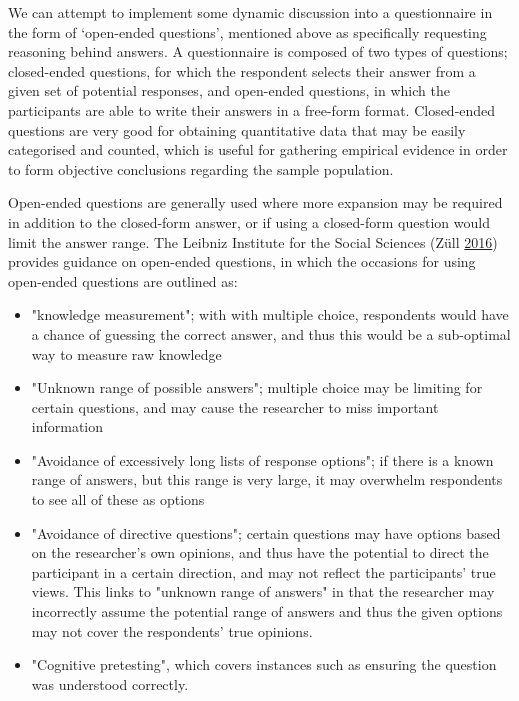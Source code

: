 \documentclass[
  11pt,
]{book}
\begin{document}
We can attempt to implement some dynamic discussion into a questionnaire
in the form of `open-ended questions', mentioned above as specifically
requesting reasoning behind answers. A questionnaire is composed of two
types of questions; closed-ended questions, for which the respondent
selects their answer from a given set of potential responses, and
open-ended questions, in which the participants are able to write their
answers in a free-form format. Closed-ended questions are very good for
obtaining quantitative data that may be easily categorised and counted,
which is useful for gathering empirical evidence in order to form
objective conclusions regarding the sample population.

Open-ended questions are generally used where more expansion may be
required in addition to the closed-form answer, or if using a
closed-form question would limit the answer range. The Leibniz Institute
for the Social Sciences (Züll \protect\hyperlink{ref-leibniz}{2016})
provides guidance on open-ended questions, in which the occasions for
using open-ended questions are outlined as:

\begin{itemize}
   \item "knowledge measurement"; with with multiple choice, respondents would have a chance of guessing the correct answer, and thus this would be a sub-optimal way to measure raw knowledge
   \item "Unknown range of possible answers"; multiple choice may be limiting for certain questions, and may cause the researcher to miss important information 
   \item "Avoidance of excessively long lists of response options"; if there is a known range of answers, but this range is very large, it may overwhelm respondents to see all of these as options
   \item "Avoidance of directive questions"; certain questions may have options based on the researcher's own opinions, and thus have the potential to direct the participant in a certain direction, and may not reflect the participants' true views. This links to "unknown range of answers" in that the researcher may incorrectly assume the potential range of answers and thus the given options may not cover the respondents' true opinions.
   \item "Cognitive pretesting", which covers instances such as ensuring the question was understood correctly.
\end{itemize}
\end{document}
